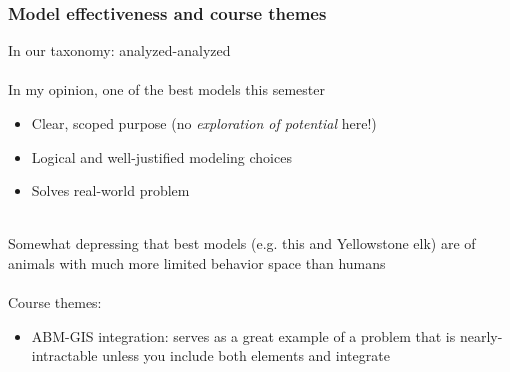 \documentclass{beamer}
\begin{document}
\begin{frame}
	\frametitle{Model effectiveness and course themes}

	In our taxonomy: analyzed-analyzed \\~\\

	In my opinion, one of the best models this semester
	\begin{itemize}
		\item \small Clear, scoped purpose (no \textit{exploration of potential} here!)
		\item \small Logical and well-justified modeling choices
		\item \small Solves real-world problem \\~\\
	\end{itemize}

	Somewhat depressing that best models (e.g. this and Yellowstone elk) are of animals with much more limited
	behavior space than humans \\~\\

	Course themes:
	\begin{itemize}
		\item \small ABM-GIS integration: serves as a great example of a problem that is nearly-intractable
			unless you include both elements and integrate
	\end{itemize}
\end{frame}
\end{document}
